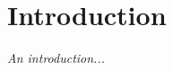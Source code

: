 \chapter{Introduction}
\label{chapter:introduction}

\emph{An introduction... \cite{example-article}}
